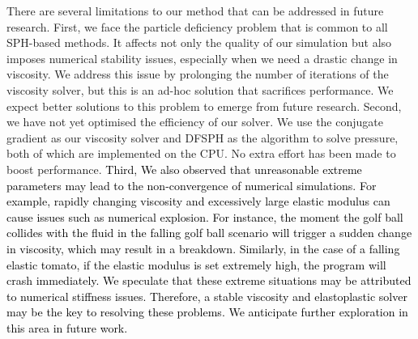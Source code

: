 \documentclass[10pt,journal,compsoc]{IEEEtran}
\newcommand{\revised}[1]{{\textcolor{black}{#1}}}
\begin{document}
There are several limitations to our method that can be addressed in future research. 
First, we face the particle deficiency problem that is common to all SPH-based methods. It affects not only the quality of our simulation but also imposes numerical stability issues, especially when we need a drastic change in viscosity. We address this issue by prolonging the number of iterations of the viscosity solver, but this is an ad-hoc solution that sacrifices performance. We expect better solutions to this problem to emerge from future research. Second, we have not yet optimised the efficiency of our solver. We use the conjugate gradient as our viscosity solver and DFSPH as the algorithm to solve pressure, both of which are implemented on the CPU. No extra effort has been made to boost performance. 
\revised{Third, We also observed that unreasonable extreme parameters may lead to the non-convergence of numerical simulations. For example, rapidly changing viscosity and excessively large elastic modulus can cause issues such as numerical explosion.} 
\revised{For instance, the moment the golf ball collides with the fluid in the falling golf ball scenario will trigger a sudden change in viscosity, which may result in a breakdown. Similarly, in the case of a falling elastic tomato, if the elastic modulus is set extremely high, the program will crash immediately. We speculate that these extreme situations may be attributed to numerical stiffness issues. Therefore, a stable viscosity and elastoplastic solver may be the key to resolving these problems. We anticipate further exploration in this area in future work.}
\end{document}
